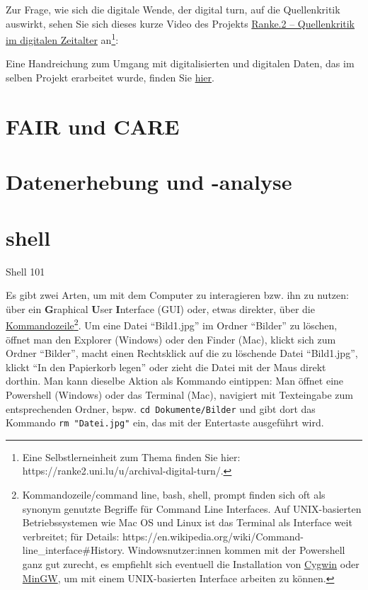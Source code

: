 \documentclass[
  letterpaper,
]{book}
\begin{document}
Zur Frage, wie sich die digitale Wende, der digital turn, auf die
Quellenkritik auswirkt, sehen Sie sich dieses kurze Video des Projekts
\href{https://ranke2.uni.lu}{Ranke.2 -- Quellenkritik im digitalen
Zeitalter} an\footnote{Eine Selbstlerneinheit zum Thema finden Sie hier:
  https://ranke2.uni.lu/u/archival-digital-turn/.}:

Eine Handreichung zum Umgang mit digitalisierten und digitalen Daten,
das im selben Projekt erarbeitet wurde, finden Sie
\href{documents/Ranke_visual-aid.pdf}{hier}.


\hypertarget{fair-und-care}{%
\chapter{FAIR und CARE}\label{fair-und-care}}


\hypertarget{datenerhebung-und--analyse}{%
\chapter{Datenerhebung und -analyse}\label{datenerhebung-und--analyse}}


\hypertarget{shell}{%
\chapter{shell}\label{shell}}

Shell 101

Es gibt zwei Arten, um mit dem Computer zu interagieren bzw. ihn zu
nutzen: über ein \textbf{G}raphical \textbf{U}ser \textbf{I}nterface
(GUI) oder, etwas direkter, über die
\href{https://de.wikipedia.org/wiki/Kommandozeile}{Kommandozeile}\footnote{Kommandozeile/command
  line, bash, shell, prompt finden sich oft als synonym genutzte
  Begriffe für Command Line Interfaces. Auf UNIX-basierten
  Betriebssystemen wie Mac OS und Linux ist das Terminal als Interface
  weit verbreitet; für Details:
  https://en.wikipedia.org/wiki/Command-line\_interface\#History.
  Windowsnutzer:innen kommen mit der Powershell ganz gut zurecht, es
  empfiehlt sich eventuell die Installation von
  \href{https://en.wikipedia.org/wiki/Cygwin}{Cygwin} oder
  \href{https://en.wikipedia.org/wiki/MinGW}{MinGW}, um mit einem
  UNIX-basierten Interface arbeiten zu können.}. Um eine Datei
``Bild1.jpg'' im Ordner ``Bilder'' zu löschen, öffnet man den Explorer
(Windows) oder den Finder (Mac), klickt sich zum Ordner ``Bilder'',
macht einen Rechtsklick auf die zu löschende Datei ``Bild1.jpg'', klickt
``In den Papierkorb legen'' oder zieht die Datei mit der Maus direkt
dorthin. Man kann dieselbe Aktion als Kommando eintippen: Man öffnet
eine Powershell (Windows) oder das Terminal (Mac), navigiert mit
Texteingabe zum entsprechenden Ordner, bspw.
\texttt{cd\ Dokumente/Bilder} und gibt dort das Kommando
\texttt{rm\ "Datei.jpg"} ein, das mit der Entertaste ausgeführt wird.
\end{document}
